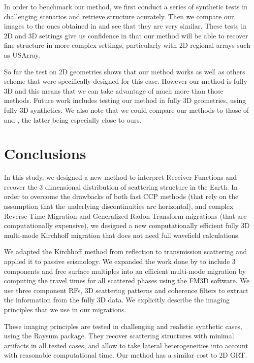 \documentclass[10pt,a4paper]{article}
\numberwithin{equation}{section}
\begin{document}
In order to benchmark our method, we first conduct a series of synthetic tests in challenging scenarios and retrieve structure acurately.
Then we compare our images to the ones obtained in \cite{pear_jgr_12} and see that they are very similar.
These tests in 2D and 3D settings give us confidence in that our method will be able to recover fine structure in more complex settings, particularly with 2D regional arrays such as USArray.

So far the test on 2D geometries shows that our method works as well as others scheme that were specifically designed for this case.
However our method is fully 3D and this means that we can take advantage of much more than those methods.
Future work includes testing our method in fully 3D geometries, using fully 3D synthetics.
We also note that we could compare our methods to those of \cite{pavl_cg_11} and \cite{hans_ggg_17}, the latter being especially close to ours.

\section{Conclusions}

In this study, we designed a new method to interpret Receiver Functions and recover the 3 dimensional distribution of scattering structure in the Earth.
In order to overcome the drawbacks of both fast CCP methods (that rely on the assumption that the underlying discontinuities are horizontal), and complex Reverse-Time Migration and Generalized Radon Transform migrations (that are computationally expensive), we designed a new computationally efficient fully 3D multi-mode Kirchhoff migration that does not need full wavefield calculations.

We adapted the Kirchhoff method from reflection to transmission scattering and applied it to passive seismology.
We expanded the work done by \cite{cheng_gji_16} to include 3 components and free surface multiples into an efficient multi-mode migration by computing the travel times for all scattered phases using the FM3D software.
We use three component RFs, 3D scattering patterns and coherence filters to extract the information from the fully 3D data.
We explicitly describe the imaging principles that we use in our migrations.

These imaging principles are tested in challenging and realistic synthetic cases, using the Raysum package.
They recover scattering structures with minimal artifacts in all tested cases, and allow to take lateral heterogeneities into account with reasonable computational time.
Our method has a similar cost to 2D GRT.
\end{document}
